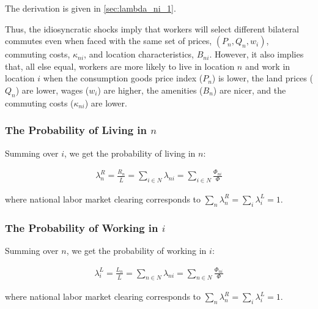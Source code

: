 \documentclass[10pt]{article}
\begin{document}
The derivation is given in \autoref{sec:lambda_ni_1}.

Thus, the idiosyncratic shocks imply that 
workers will select different bilateral commutes even 
when faced with the same set of prices, $(P_n, Q_n, w_i)$,
commuting costs, $\kappa_{n i}$, and location characteristics, $B_{n i}$.
However, it also implies that, all else equal, 
workers are more likely to live in location $n$
and work in location $i$ when 
the consumption goods price index ($P_n$) is lower,
the land prices ($Q_n$) are lower, wages ($w_i$) are higher,
the amenities ($B_n$) are nicer, and the commuting 
costs ($\kappa_{n i}$) are lower.

\subsubsection{The Probability of Living in $n$}

Summing over $i$, we get the probability of living in $n$:

\begin{align}
    \lambda_n^R=\frac{R_n}{\bar{L}}=\sum_{i \in N} \lambda_{n i}=\sum_{i \in N} \frac{\Phi_{n i}}{\Phi}
\end{align}

where national labor market clearing 
corresponds to $\sum_n \lambda_n^R=\sum_i \lambda_i^L=1$.


\subsubsection{The Probability of Working in $i$}

Summing over $n$, we get the probability of working in $i$:

\begin{align}
    \lambda_i^L=\frac{L_n}{\bar{L}}=\sum_{n \in N} \lambda_{n i}=\sum_{n \in N} \frac{\Phi_{n i}}{\Phi}
\end{align}

where national labor market clearing 
corresponds to $\sum_n \lambda_n^R=\sum_i \lambda_i^L=1$.

\end{document}
